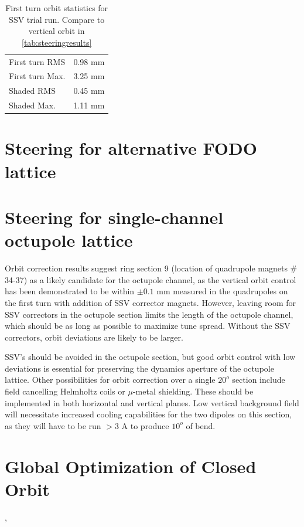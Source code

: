\begin{table}[h]
\centering
\caption{First turn orbit statistics for SSV trial run. Compare to vertical orbit in \ref{tab:steeringresults}}
\label{tab:SSVexporbit}
\begin{tabular}{|l|c|}
\hline
First turn RMS & 0.98 mm\\
First turn Max. & 3.25 mm\\
Shaded RMS & 0.45 mm\\
Shaded Max. & 1.11 mm \\
\hline
\end{tabular}
\end{table}



\section{Steering for alternative FODO lattice}


\section{Steering for single-channel octupole lattice}

Orbit correction results suggest ring section 9 (location of quadrupole magnets \# 34-37) as a likely candidate for the octupole channel, as the vertical orbit control has been demonstrated to be within $\pm 0.1$ mm measured in the quadrupoles on the first turn with addition of SSV corrector magnets. However, leaving room for SSV correctors in the octupole section limits the length of the octupole channel, which should be as long as possible to maximize tune spread. Without the SSV correctors, orbit deviations are likely to be larger. 

SSV's should be avoided in the octupole section, but good orbit control with low deviations is essential for preserving the dynamics aperture of the octupole lattice. Other possibilities for orbit correction over a single $20^o$ section include field cancelling Helmholtz coils or $\mu$-metal shielding. These should be implemented in both horizontal and vertical planes. Low vertical background field will necessitate increased cooling capabilities for the two dipoles on this section, as they will have to be run $>3$ A to produce $10^o$ of bend. 




\section{Global Optimization of Closed Orbit}
\cite{Kirkpatrick2015} %
\cite{Huang2013}, \cite{LevonRCDS} %

